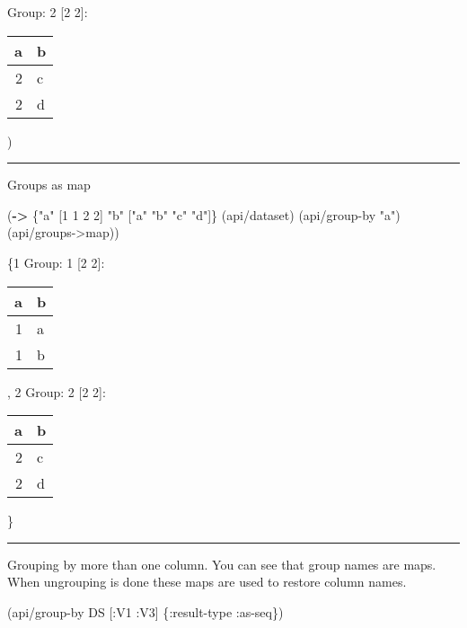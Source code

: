 \documentclass[]{article}
\newenvironment{Shaded}{\begin{snugshade}}{\end{snugshade}}
\newcommand{\KeywordTok}[1]{\textcolor[rgb]{0.13,0.29,0.53}{\textbf{#1}}}
\newcommand{\DecValTok}[1]{\textcolor[rgb]{0.00,0.00,0.81}{#1}}
\newcommand{\StringTok}[1]{\textcolor[rgb]{0.31,0.60,0.02}{#1}}
\newcommand{\AttributeTok}[1]{\textcolor[rgb]{0.77,0.63,0.00}{#1}}
\newcommand{\NormalTok}[1]{#1}
\begin{document}
Group: 2 {[}2 2{]}:

\begin{longtable}[]{@{}rl@{}}
\toprule
a & b\tabularnewline
\midrule
\endhead
2 & c\tabularnewline
2 & d\tabularnewline
\bottomrule
\end{longtable}

)

\begin{center}\rule{0.5\linewidth}{0.5pt}\end{center}

Groups as map

\begin{Shaded}
\begin{Highlighting}[]
\NormalTok{(}\KeywordTok{->}\NormalTok{ \{}\StringTok{"a"}\NormalTok{ [}\DecValTok{1} \DecValTok{1} \DecValTok{2} \DecValTok{2}\NormalTok{]}
     \StringTok{"b"}\NormalTok{ [}\StringTok{"a"} \StringTok{"b"} \StringTok{"c"} \StringTok{"d"}\NormalTok{]\}}
\NormalTok{    (api/dataset)}
\NormalTok{    (api/group-by }\StringTok{"a"}\NormalTok{)}
\NormalTok{    (api/groups->map))}
\end{Highlighting}
\end{Shaded}

\{1 Group: 1 {[}2 2{]}:

\begin{longtable}[]{@{}rl@{}}
\toprule
a & b\tabularnewline
\midrule
\endhead
1 & a\tabularnewline
1 & b\tabularnewline
\bottomrule
\end{longtable}

, 2 Group: 2 {[}2 2{]}:

\begin{longtable}[]{@{}rl@{}}
\toprule
a & b\tabularnewline
\midrule
\endhead
2 & c\tabularnewline
2 & d\tabularnewline
\bottomrule
\end{longtable}

\}

\begin{center}\rule{0.5\linewidth}{0.5pt}\end{center}

Grouping by more than one column. You can see that group names are maps.
When ungrouping is done these maps are used to restore column names.

\begin{Shaded}
\begin{Highlighting}[]
\NormalTok{(api/group-by DS [}\AttributeTok{:V1} \AttributeTok{:V3}\NormalTok{] \{}\AttributeTok{:result-type} \AttributeTok{:as-seq}\NormalTok{\})}
\end{Highlighting}
\end{Shaded}
\end{document}
